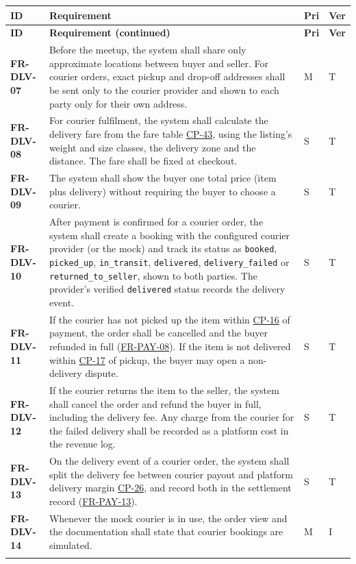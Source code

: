 \documentclass[11pt,a4paper]{report}
\makeatletter
\newenvironment{reqs}{%
  \small
  \begin{longtable}{@{}>{\raggedright\arraybackslash}p{2.35cm}
                       >{\raggedright\arraybackslash}p{10.3cm}
                       >{\centering\arraybackslash}p{0.7cm}
                       >{\centering\arraybackslash}p{0.7cm}@{}}
  \toprule
  \textbf{ID} & \textbf{Requirement} & \textbf{Pri} & \textbf{Ver} \\
  \midrule
  \endfirsthead
  \toprule
  \textbf{ID} & \textbf{Requirement (continued)} & \textbf{Pri} & \textbf{Ver} \\
  \midrule
  \endhead
  \bottomrule
  \endfoot
}{\end{longtable}}
\newcommand{\req}[5]{\leavevmode\textbf{#1}\hypertarget{#1}{} & #5 & #2 & #3 \\ \addlinespace[2pt]}
\newcommand{\rr}[1]{\hyperlink{#1}{#1}}
\newcommand{\cp}[1]{\hyperlink{#1}{#1}}
\makeatother
\begin{document}
\begin{reqs}
\req{FR-DLV-07}{M}{T}{FR-53}{Before the meetup, the system shall share only approximate locations between buyer and seller. For courier orders, exact pickup and drop-off addresses shall be sent only to the courier provider and shown to each party only for their own address.}
\req{FR-DLV-08}{S}{T}{FR-54}{For courier fulfilment, the system shall calculate the delivery fare from the fare table \cp{CP-43}, using the listing's weight and size classes, the delivery zone and the distance. The fare shall be fixed at checkout.}
\req{FR-DLV-09}{S}{T}{FR-55}{The system shall show the buyer one total price (item plus delivery) without requiring the buyer to choose a courier.}
\req{FR-DLV-10}{S}{T}{FR-56, FR-57}{After payment is confirmed for a courier order, the system shall create a booking with the configured courier provider (or the mock) and track its status as \texttt{booked}, \texttt{picked\_up}, \texttt{in\_transit}, \texttt{delivered}, \texttt{delivery\_failed} or \texttt{returned\_to\_seller}, shown to both parties. The provider's verified \texttt{delivered} status records the delivery event.}
\req{FR-DLV-11}{S}{T}{new}{If the courier has not picked up the item within \cp{CP-16} of payment, the order shall be cancelled and the buyer refunded in full (\rr{FR-PAY-08}). If the item is not delivered within \cp{CP-17} of pickup, the buyer may open a non-delivery dispute.}
\req{FR-DLV-12}{S}{T}{new}{If the courier returns the item to the seller, the system shall cancel the order and refund the buyer in full, including the delivery fee. Any charge from the courier for the failed delivery shall be recorded as a platform cost in the revenue log.}
\req{FR-DLV-13}{S}{T}{FR-58}{On the delivery event of a courier order, the system shall split the delivery fee between courier payout and platform delivery margin \cp{CP-26}, and record both in the settlement record (\rr{FR-PAY-13}).}
\req{FR-DLV-14}{M}{I}{C-3}{Whenever the mock courier is in use, the order view and the documentation shall state that courier bookings are simulated.}
\end{reqs}
\end{document}
